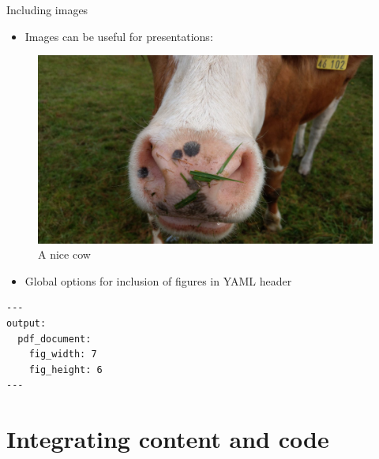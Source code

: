 \documentclass[
  10pt,
  ignorenonframetext,
]{beamer}
\providecommand{\tightlist}{%
  \setlength{\itemsep}{0pt}\setlength{\parskip}{0pt}}
\begin{document}
\begin{frame}[fragile]{Including images}
\protect\hypertarget{including-images}{}
\begin{itemize}[<+->]
\tightlist
\item
  Images can be useful for presentations:
\end{itemize}

\pause

\begin{figure}

{\centering \includegraphics[width=0.4\linewidth]{figs/cow} 

}

\caption{A nice cow}\label{fig:unnamed-chunk-1}
\end{figure}

\pause

\begin{itemize}[<+->]
\tightlist
\item
  Global options for inclusion of figures in YAML header
\end{itemize}

\begin{verbatim}
---
output:
  pdf_document:
    fig_width: 7
    fig_height: 6
---
\end{verbatim}
\end{frame}

\hypertarget{integrating-content-and-code}{%
\section{Integrating content and
code}\label{integrating-content-and-code}}
\end{document}
